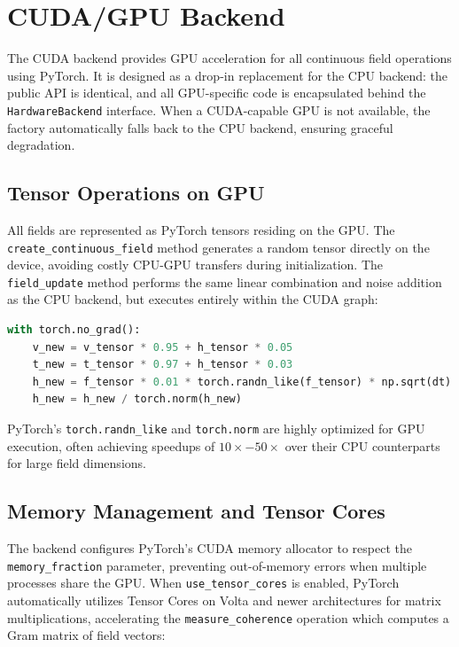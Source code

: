 \newpage
\section{CUDA/GPU Backend}

The CUDA backend provides GPU acceleration for all continuous field operations using PyTorch. It is designed as a drop-in replacement for the CPU backend: the public API is identical, and all GPU-specific code is encapsulated behind the \texttt{HardwareBackend} interface. When a CUDA-capable GPU is not available, the factory automatically falls back to the CPU backend, ensuring graceful degradation.

\subsection{Tensor Operations on GPU}

All fields are represented as PyTorch tensors residing on the GPU. The \texttt{create\_continuous\_field} method generates a random tensor directly on the device, avoiding costly CPU-GPU transfers during initialization. The \texttt{field\_update} method performs the same linear combination and noise addition as the CPU backend, but executes entirely within the CUDA graph:

\begin{lstlisting}[language=Python]
with torch.no_grad():
    v_new = v_tensor * 0.95 + h_tensor * 0.05
    t_new = t_tensor * 0.97 + h_tensor * 0.03
    h_new = f_tensor * 0.01 * torch.randn_like(f_tensor) * np.sqrt(dt)
    h_new = h_new / torch.norm(h_new)
\end{lstlisting}

PyTorch's \texttt{torch.randn\_like} and \texttt{torch.norm} are highly optimized for GPU execution, often achieving speedups of \(10\times - 50\times\) over their CPU counterparts for large field dimensions.

\subsection{Memory Management and Tensor Cores}

The backend configures PyTorch's CUDA memory allocator to respect the \texttt{memory\_fraction} parameter, preventing out-of-memory errors when multiple processes share the GPU. When \texttt{use\_tensor\_cores} is enabled, PyTorch automatically utilizes Tensor Cores on Volta and newer architectures for matrix multiplications, accelerating the \texttt{measure\_coherence} operation which computes a Gram matrix of field vectors:

